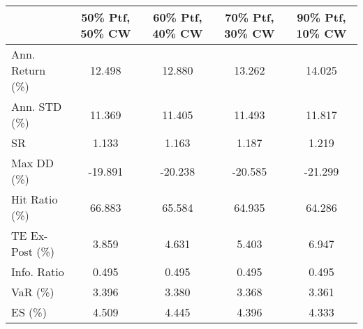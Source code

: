 \begin{tabular}{lcccc}
\toprule
{} &  50\% Ptf, 50\% CW &  60\% Ptf, 40\% CW &  70\% Ptf, 30\% CW &  90\% Ptf, 10\% CW \\
\midrule
Ann. Return (\%) &           12.498 &           12.880 &           13.262 &           14.025 \\
Ann. STD (\%)    &           11.369 &           11.405 &           11.493 &           11.817 \\
SR              &            1.133 &            1.163 &            1.187 &            1.219 \\
Max DD (\%)      &          -19.891 &          -20.238 &          -20.585 &          -21.299 \\
Hit Ratio (\%)   &           66.883 &           65.584 &           64.935 &           64.286 \\
TE Ex-Post (\%)  &            3.859 &            4.631 &            5.403 &            6.947 \\
Info. Ratio     &            0.495 &            0.495 &            0.495 &            0.495 \\
VaR (\%)         &            3.396 &            3.380 &            3.368 &            3.361 \\
ES (\%)          &            4.509 &            4.445 &            4.396 &            4.333 \\
\bottomrule
\end{tabular}
